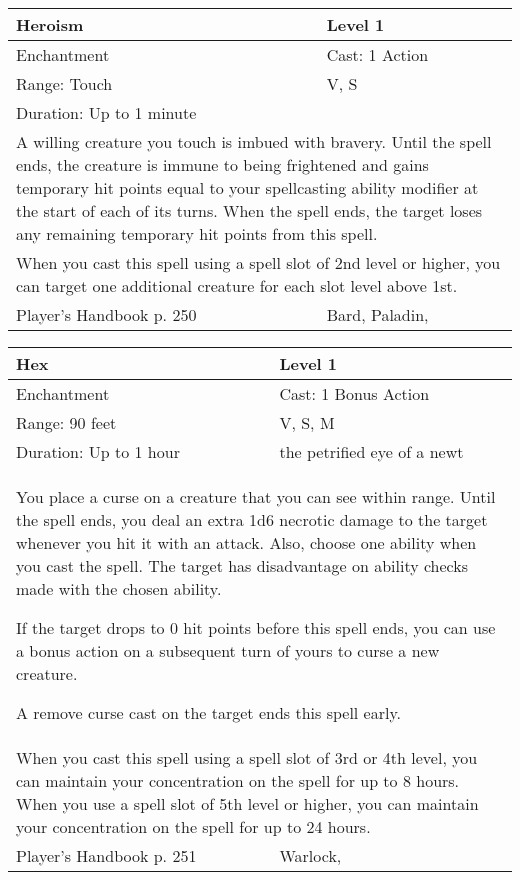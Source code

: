 \documentclass[11pt]{report}
\begin{document}
\begin{table}[H]
	\begin{tabular}{||p{6cm}|p{6cm}||}
		\hline\hline
		\bf{Heroism} & Level 1\\ \hline
		Enchantment & Cast: 1 Action\\ \hline
		Range: Touch & V, S\\ \hline
		Duration: Up to 1 minute & \\ \hline
		\multicolumn{2}{||p{12cm}||}{A willing creature you touch is imbued with bravery.
Until the spell ends, the creature is immune to being frightened and gains temporary hit points equal to your spellcasting ability modifier at the start of each of its turns. When the spell ends, the target loses any remaining temporary hit points from this spell.}\\ \hline
		\multicolumn{2}{||p{12cm}||}{When you cast this spell using a spell slot of 2nd level or higher, you can target one additional creature for each slot level above 1st.}\\ \hline
Player's Handbook p. 250 & Bard, Paladin, \\ \hline\hline
	\end{tabular}
\end{table}

\begin{table}[H]
	\begin{tabular}{||p{6cm}|p{6cm}||}
		\hline\hline
		\bf{Hex} & Level 1\\ \hline
		Enchantment & Cast: 1 Bonus Action\\ \hline
		Range: 90 feet & V, S, M\\ \hline
		Duration: Up to 1 hour & the petrified eye of a newt\\ \hline
		\multicolumn{2}{||p{12cm}||}{You place a curse on a creature that you can see within range. Until the spell ends, you deal an extra 1d6 necrotic damage to the target whenever you hit it with an attack. Also, choose one ability when you cast the spell. The target has disadvantage on ability checks made with the chosen ability.

If the target drops to 0 hit points before this spell ends, you can use a bonus action on a subsequent turn of yours to curse a new creature.

A remove curse cast on the target ends this spell early.}\\ \hline
		\multicolumn{2}{||p{12cm}||}{When you cast this spell using a spell slot of 3rd or 4th level, you can maintain your concentration on the spell for up to 8 hours.
When you use a spell slot of 5th level or higher, you can maintain your concentration on the spell for up to 24 hours.}\\ \hline
Player's Handbook p. 251 & Warlock, \\ \hline\hline
	\end{tabular}
\end{table}
\end{document}
